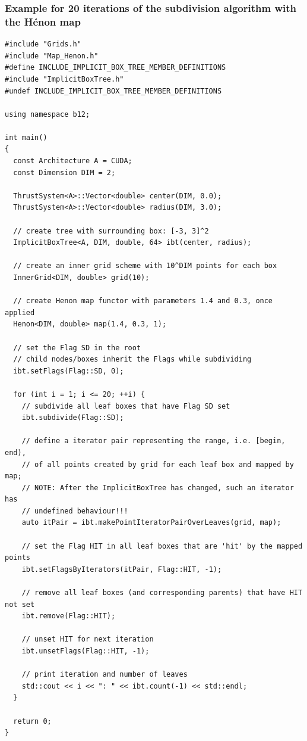 \documentclass[a4paper,10pt,fleqn]{article}
\begin{document}
\subsubsection*{Example for 20 iterations of the subdivision algorithm with the H\'{e}non map}

\begin{verbatim}
#include "Grids.h" 
#include "Map_Henon.h"
#define INCLUDE_IMPLICIT_BOX_TREE_MEMBER_DEFINITIONS
#include "ImplicitBoxTree.h"
#undef INCLUDE_IMPLICIT_BOX_TREE_MEMBER_DEFINITIONS

using namespace b12;

int main()
{
  const Architecture A = CUDA;
  const Dimension DIM = 2;
  
  ThrustSystem<A>::Vector<double> center(DIM, 0.0);
  ThrustSystem<A>::Vector<double> radius(DIM, 3.0);
  
  // create tree with surrounding box: [-3, 3]^2
  ImplicitBoxTree<A, DIM, double, 64> ibt(center, radius);
  
  // create an inner grid scheme with 10^DIM points for each box
  InnerGrid<DIM, double> grid(10);
  
  // create Henon map functor with parameters 1.4 and 0.3, once applied
  Henon<DIM, double> map(1.4, 0.3, 1);
  
  // set the Flag SD in the root
  // child nodes/boxes inherit the Flags while subdividing
  ibt.setFlags(Flag::SD, 0);
  
  for (int i = 1; i <= 20; ++i) {
    // subdivide all leaf boxes that have Flag SD set
    ibt.subdivide(Flag::SD);
    
    // define a iterator pair representing the range, i.e. [begin, end),
    // of all points created by grid for each leaf box and mapped by map;
    // NOTE: After the ImplicitBoxTree has changed, such an iterator has
    // undefined behaviour!!!
    auto itPair = ibt.makePointIteratorPairOverLeaves(grid, map);
    
    // set the Flag HIT in all leaf boxes that are 'hit' by the mapped points
    ibt.setFlagsByIterators(itPair, Flag::HIT, -1);
    
    // remove all leaf boxes (and corresponding parents) that have HIT not set
    ibt.remove(Flag::HIT);
    
    // unset HIT for next iteration
    ibt.unsetFlags(Flag::HIT, -1);
    
    // print iteration and number of leaves
    std::cout << i << ": " << ibt.count(-1) << std::endl;
  }
  
  return 0;
}
\end{verbatim}
\end{document}
